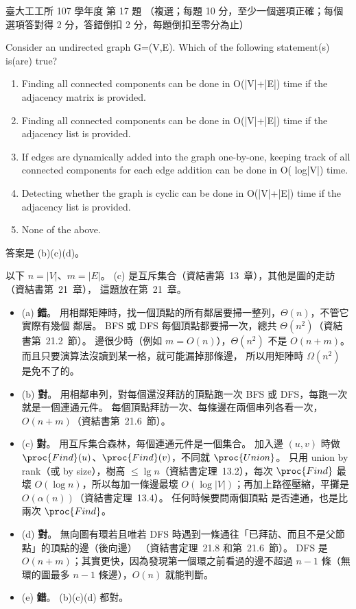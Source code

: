 \begin{pastexam}[label={px:ntu-107-ie-ds-17}]{臺大工工所 107 學年度 第 17 題}
（複選；每題 10 分，至少一個選項正確；每個選項答對得 2 分，答錯倒扣 2 分，每題倒扣至零分為止）

Consider an undirected graph G=(V,E). Which of the following statement(s) is(are) true?
\begin{enumerate}[label=(\alph*),nosep]
\item Finding all connected components can be done in O(|V|+|E|) time if the adjacency matrix is provided.
\item Finding all connected components can be done in O(|V|+|E|) time if the adjacency list is provided.
\item If edges are dynamically added into the graph one-by-one, keeping track of all connected components for each edge addition can be done in O( log|V|) time.
\item Detecting whether the graph is cyclic can be done in O(|V|+|E|) time if the adjacency list is provided.
\item None of the above.
\end{enumerate}
\end{pastexam}

\begin{pastsoln}
答案是 (b)(c)(d)。

以下 $n = |V|$、$m = |E|$。 (c) 是互斥集合（資結書第~13~章），其他是圖的走訪（資結書第~21~章），
這題放在第~21~章。
\begin{itemize}
\item (a) \textbf{錯}。 用相鄰矩陣時，找一個頂點的所有鄰居要掃一整列，$\Theta(n)$，不管它實際有幾個
鄰居。 BFS 或 DFS 每個頂點都要掃一次，總共 $\Theta(n^2)$（資結書第~21.2~節）。 邊很少時（例如
$m = O(n)$），$\Theta(n^2)$ 不是 $O(n + m)$。 而且只要演算法沒讀到某一格，就可能漏掉那條邊，
所以用矩陣時 $\Omega(n^2)$ 是免不了的。
\item (b) \textbf{對}。 用相鄰串列，對每個還沒拜訪的頂點跑一次 BFS 或 DFS，每跑一次就是一個連通元件。
每個頂點拜訪一次、每條邊在兩個串列各看一次，$O(n + m)$（資結書第~21.6~節）。
\item (c) \textbf{對}。 用互斥集合森林，每個連通元件是一個集合。 加入邊 $(u, v)$ 時做
$\proc{Find}(u)$、$\proc{Find}(v)$，不同就 $\proc{Union}$。 只用 union by rank（或 by size），樹高
$\le \lg n$（資結書定理~13.2），每次 $\proc{Find}$ 最壞 $O(\log n)$，所以每加一條邊最壞
$O(\log |V|)$；再加上路徑壓縮，平攤是 $O(\alpha(n))$（資結書定理~13.4）。 任何時候要問兩個頂點
是否連通，也是比兩次 $\proc{Find}$。
\item (d) \textbf{對}。 無向圖有環若且唯若 DFS 時遇到一條通往「已拜訪、而且不是父節點」的頂點的邊（後向邊）
（資結書定理~21.8 和第~21.6~節）。 DFS 是 $O(n + m)$；其實更快，因為發現第一個環之前看過的邊不超過 $n - 1$
條（無環的圖最多 $n - 1$ 條邊），$O(n)$ 就能判斷。
\item (e) \textbf{錯}。 (b)(c)(d) 都對。
\end{itemize}
\end{pastsoln}
